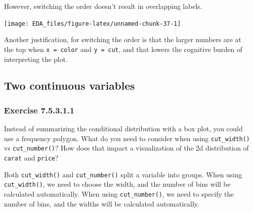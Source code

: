 \documentclass[]{book}
\newenvironment{Shaded}{\begin{snugshade}}{\end{snugshade}}
\newcommand{\DataTypeTok}[1]{\textcolor[rgb]{0.13,0.29,0.53}{#1}}
\newcommand{\KeywordTok}[1]{\textcolor[rgb]{0.13,0.29,0.53}{\textbf{#1}}}
\newcommand{\NormalTok}[1]{#1}
\newcommand{\OperatorTok}[1]{\textcolor[rgb]{0.81,0.36,0.00}{\textbf{#1}}}
\newcommand{\StringTok}[1]{\textcolor[rgb]{0.31,0.60,0.02}{#1}}
\theoremstyle{plain}
\theoremstyle{remark}
\begin{document}
However, switching the order doesn't result in overlapping labels.

\begin{Shaded}
\end{Shaded}

\begin{center}\texttt{[image: EDA\_files/figure-latex/unnamed-chunk-37-1]} \end{center}

Another justification, for switching the order is that the larger numbers are at the top when \texttt{x\ =\ color} and \texttt{y\ =\ cut}, and that lowers the cognitive burden of interpreting the plot.

\hypertarget{two-continuous-variables}{%
\subsection{Two continuous variables}\label{two-continuous-variables}}

\hypertarget{exercise-7.5.3.1.1}{%
\subsubsection*{\texorpdfstring{Exercise {7.5.3.1.1}}{Exercise 7.5.3.1.1}}\label{exercise-7.5.3.1.1}}

Instead of summarizing the conditional distribution with a box plot, you could use a frequency polygon.
What do you need to consider when using \texttt{cut\_width()} vs \texttt{cut\_number()}?
How does that impact a visualization of the 2d distribution of \texttt{carat} and \texttt{price}?

Both \texttt{cut\_width()} and \texttt{cut\_number()} split a variable into groups.
When using \texttt{cut\_width()}, we need to choose the width, and the number of
bins will be calculated automatically.
When using \texttt{cut\_number()}, we need to specify the number of bins, and
the widths will be calculated automatically.
\end{document}
